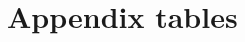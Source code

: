 \documentclass[12pt,letterpaper]{article}
\begin{document}
%
%  
%
%  

\appendix

\setcounter{figure}{0}
\setcounter{table}{0}
\renewcommand\thefigure{\Alph{section}.\arabic{figure}}
\renewcommand\thetable{\Alph{section}.\arabic{table}}
  
\section{Appendix tables}\label{sec:appendix_table}
\end{document}
